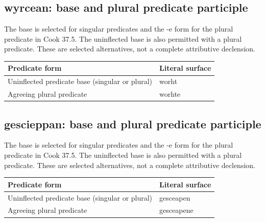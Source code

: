 \subsection*{wyrcean: base and plural predicate participle}

The base is selected for singular predicates and the -e form for the plural predicate in Cook 37.5. The uninflected base is also permitted with a plural predicate. These are selected alternatives, not a complete attributive declension.

\par\begingroup
\fontsize{10.5}{13.2}\selectfont
\setlength{\LTleft}{0pt}\setlength{\LTright}{\fill}
\noindent
\begin{tabular}{@{}>{\raggedright\arraybackslash}p{87.2mm}>{\raggedright\arraybackslash}p{33.98mm}@{}}
\toprule
\textbf{Predicate form} & \textbf{Literal surface} \\
\midrule
Uninflected predicate base (singular or plural) & worht \\
Agreeing plural predicate & worhte \\
\bottomrule
\end{tabular}
\par\endgroup

\subsection*{gescieppan: base and plural predicate participle}

The base is selected for singular predicates and the -e form for the plural predicate in Cook 37.5. The uninflected base is also permitted with a plural predicate. These are selected alternatives, not a complete attributive declension.

\par\begingroup
\fontsize{10.5}{13.2}\selectfont
\setlength{\LTleft}{0pt}\setlength{\LTright}{\fill}
\noindent
\begin{tabular}{@{}>{\raggedright\arraybackslash}p{83.56mm}>{\raggedright\arraybackslash}p{37.63mm}@{}}
\toprule
\textbf{Predicate form} & \textbf{Literal surface} \\
\midrule
Uninflected predicate base (singular or plural) & gesceapen \\
Agreeing plural predicate & gesceapene \\
\bottomrule
\end{tabular}
\par\endgroup

